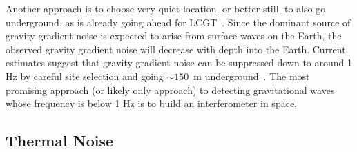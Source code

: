 \documentclass{article}
\begin{document}
Another approach is to choose very quiet location, or better still, to also go
underground, as is already going ahead for LCGT~\cite{Miyoki:2005}.  Since the
dominant source of gravity gradient noise is expected to arise from surface
waves on the Earth, the observed gravity gradient noise will decrease with depth
into the Earth.  Current estimates suggest that gravity gradient noise can be
suppressed down to around 1 Hz by careful site selection and going $\sim 150$~m
underground~\cite{Beker:2011}.  The most promising approach (or likely only
approach) to detecting gravitational waves whose frequency is below 1 Hz is to
build an interferometer in space.


\subsection{Thermal Noise}
\label{subsection:thermal}
\end{document}
